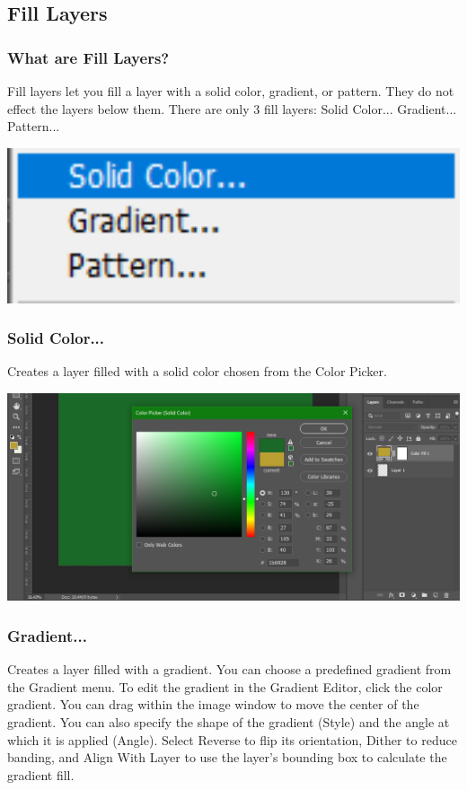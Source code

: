 \documentclass{beamer}
\begin{document}
\subsection{Fill Layers}
\begin{frame}
	\frametitle{What are Fill Layers?}
	\begin{outline}
		\1 Fill layers let you fill a layer with a solid color, gradient, or pattern.
		\1 They do not effect the layers below them.
		\1 There are only 3 fill layers:
		\2 Solid Color...
		\2 Gradient...
		\2 Pattern...
	\end{outline}
	\begin{center}
		\includegraphics[width = 1.0\textwidth]{images/fill3.png}
	\end{center}
\end{frame}

\begin{frame}
	\frametitle{Solid Color...}
	\begin{outline}
		\1 Creates a layer filled with a solid color chosen from the Color Picker.
	\end{outline}
	\begin{center}
		\includegraphics[width = 1.0\textwidth]{images/solid colour.png}
	\end{center}
\end{frame}

\begin{frame}
	\frametitle{Gradient...}
	\begin{outline}
		\1 Creates a layer filled with a gradient. 
		\2 You can choose a predefined gradient from the Gradient menu. 
		\3 To edit the gradient in the Gradient Editor, click the color gradient. 
		\3 You can drag within the image window to move the center of the gradient.  
		\2 You can also specify the shape of the gradient (Style) and the angle at which it is applied (Angle). 
		\2 Select Reverse to flip its orientation, Dither to reduce banding, and Align With Layer to use the layer’s bounding box to calculate the gradient fill.
	\end{outline}
\end{frame}
\end{document}
